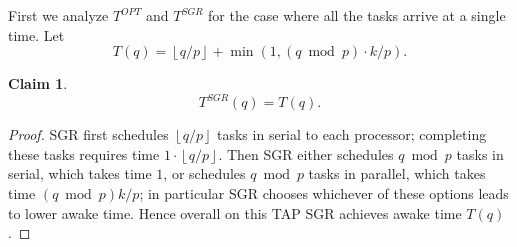 \documentclass[twocolumn]{article}[10pt]
\newcommand{\floor}[1]{\left\lfloor #1 \right\rfloor}
\newtheorem{claim}{Claim}
\begin{document}
First we analyze $T^{OPT}$ and $T^{SGR}$ for the case where all
the tasks arrive at a single time.
Let $$T(q) = \floor{q/p} + \min(1, (q\bmod p)\cdot k/p). $$

\begin{claim}
  \label{clm:sgr_single}
  $$T^{SGR}(q) = T(q).$$
\end{claim}
\begin{proof}
  SGR first schedules $\floor{q/p}$ tasks in serial to
  each processor; completing these tasks requires time $1\cdot \floor{q/p}$. 
  Then SGR either schedules $q\bmod p$ tasks
  in serial, which takes time $1$, or schedules $q\bmod p$
  tasks in parallel, which takes time $(q\bmod p)k/p$; in
  particular SGR chooses whichever of these options leads to
  lower awake time. Hence overall on this TAP
  SGR achieves awake time $T(q)$.
\end{proof}
\end{document}

